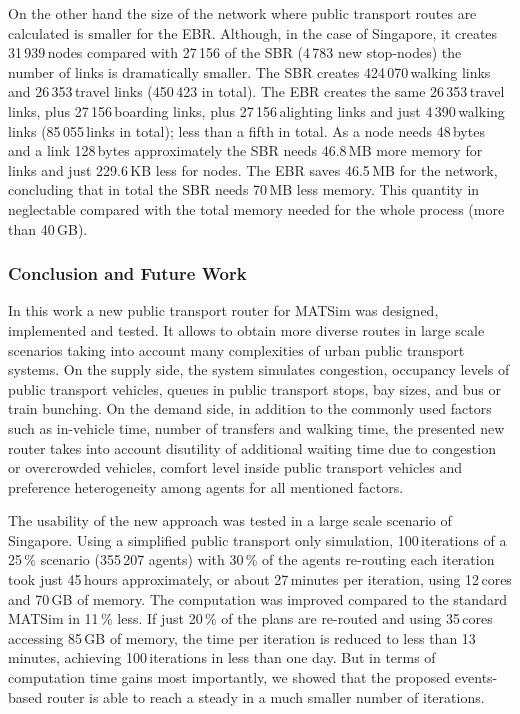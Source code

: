 On the other hand the size of the network where public transport routes are calculated is smaller for the EBR. Although, in the case of Singapore, it creates 31\,939\,nodes compared with 27\,156 of the SBR (4\,783 new stop-nodes) the number of links is dramatically smaller. The SBR creates 424\,070\,walking links and 26\,353\,travel links (450\,423 in total). The EBR creates the same 26\,353\,travel links, plus 27\,156\,boarding links, plus 27\,156\,alighting links and just 4\,390\,walking links (85\,055\,links in total); less than a fifth in total. As a node needs 48\,bytes and a link 128\,bytes approximately the SBR needs 46.8\,MB more memory for links and just 229.6\,KB less for nodes. The EBR saves 46.5\,MB for the network, concluding that in total the SBR needs 70\,MB less memory. This quantity in neglectable compared with the total memory needed for the whole process (more than 40\,GB).

\subsubsection{Conclusion and Future Work} 
\label{sec:ConclusionsAndOutlook}
In this work a new public transport router for MATSim was designed, implemented and tested. It allows to obtain more diverse routes in large scale scenarios taking into account many complexities of urban public transport systems. On the supply side, the system simulates congestion, occupancy levels of public transport vehicles, queues in public transport stops, bay sizes, and bus or train bunching. On the demand side, in addition to the commonly used factors such as in-vehicle time, number of transfers and walking time, the presented new router takes into account disutility of additional waiting time due to congestion or overcrowded vehicles, comfort level inside public transport vehicles and preference heterogeneity among agents for all mentioned factors.

The usability of the new approach was tested in a large scale scenario of Singapore. Using a simplified public transport only simulation, 100\,iterations of a 25\,\% scenario (355\,207 agents) with 30\,\% of the agents re-routing each iteration took just 45\,hours approximately, or about 27\,minutes per iteration, using 12\,cores and 70\,GB of memory. The computation was improved compared to the standard MATSim in 11\,\% less. If just 20\,\% of the plans are re-routed and using 35\,cores accessing 85\,GB of memory, the time per iteration is reduced to less than 13\,minutes, achieving 100\,iterations in less than one day. But in terms of computation time gains most importantly, we showed that the proposed events-based router is able to reach a steady in a much smaller number of iterations.

